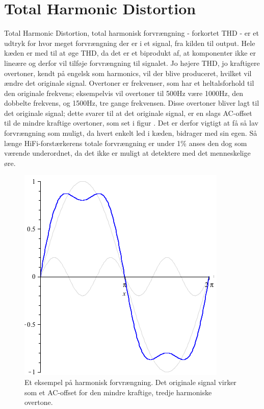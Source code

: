 \section{Total Harmonic Distortion}
\label{thd}
Total Harmonic Distortion, total harmonisk forvrængning - forkortet THD - er et udtryk for hvor meget forvrængning der er i et signal, fra kilden til output.  Hele kæden er med til at øge THD, da det er et biprodukt af, at komponenter ikke er lineære og derfor vil tilføje forvrængning til signalet. Jo højere THD, jo kraftigere overtoner, kendt på engelsk som harmonics, vil der blive produceret, hvilket vil ændre det originale signal. Overtoner er frekvenser, som har et heltalsforhold til den originale frekvens; eksempelvis vil overtoner til 500Hz være 1000Hz, den dobbelte frekvens, og 1500Hz, tre gange frekvensen. Disse overtoner bliver lagt til det originale signal; dette svarer til at det originale signal, er en slags AC-offset til de mindre kraftige overtoner, som set i figur . Det er derfor vigtigt at få så lav forvrængning som muligt, da hvert enkelt led i kæden, bidrager med sin egen. Så længe HiFi-forstærkerens totale forvrængning er under 1\% anses den dog som værende underordnet, da det ikke er muligt at detektere med det menneskelige øre.

\begin{figure}[h]
\centering
\includegraphics[scale=.4]{valg_af_loesning/thd/thdsamlet.png}
\caption{Et eksempel på harmonisk forvrængning. Det originale signal virker som et AC-offset for den mindre kraftige, tredje harmoniske overtone.}
\label{fig:harmonic_distortion}
\end{figure}